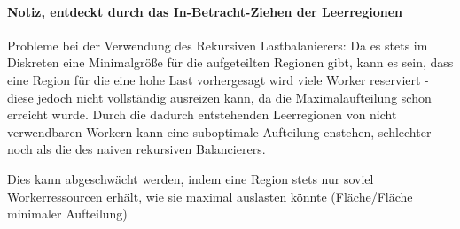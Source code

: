 \paragraph{Notiz, entdeckt durch das In-Betracht-Ziehen der Leerregionen}

Probleme bei der Verwendung des Rekursiven Lastbalanierers:
Da es stets im Diskreten eine Minimalgröße für die aufgeteilten Regionen gibt,
kann es sein, dass eine Region für die eine hohe Last vorhergesagt wird viele Worker reserviert -
diese jedoch nicht vollständig ausreizen kann, da die Maximalaufteilung schon erreicht wurde.
Durch die dadurch entstehenden Leerregionen von nicht verwendbaren Workern
kann eine suboptimale Aufteilung enstehen, schlechter noch als die des naiven rekursiven Balancierers.

Dies kann abgeschwächt werden, indem eine Region stets nur soviel Workerressourcen erhält,
wie sie maximal auslasten könnte (Fläche/Fläche minimaler Aufteilung)
